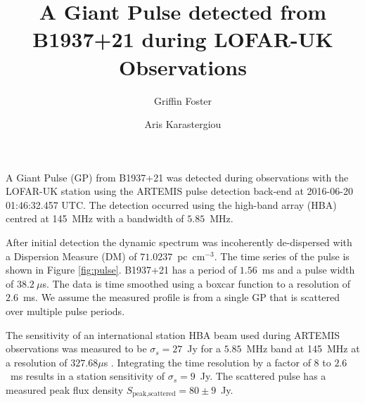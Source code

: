 \documentclass[RNAAS]{aastex62}
\begin{document}
\title{A Giant Pulse detected from B1937+21 during LOFAR-UK Observations}


\author[0000-0002-7559-4291]{Griffin Foster}

\author{Aris Karastergiou}


\section{}


A Giant Pulse (GP) from B1937+21 \citep{1982Natur.300..615B} was detected during
observations with the LOFAR-UK station using the ARTEMIS
\citep{2015MNRAS.452.1254K} pulse detection back-end at 2016-06-20 01:46:32.457
UTC. The detection occurred using the high-band array (HBA) centred at 145~MHz
with a bandwidth of $5.85$~MHz.

After initial detection the dynamic spectrum was incoherently de-dispersed with
a Dispersion Measure (DM) of $71.0237$~pc~cm$^{-3}$.  The time series of the
pulse is shown in Figure \ref{fig:pulse}.  B1937+21 has a period of $1.56$~ms
and a pulse width of $38.2~\mu$s.  The data is time smoothed using a boxcar
function to a resolution of $2.6$~ms. We assume the measured profile is from a
single GP that is scattered over multiple pulse periods.

The sensitivity of an international station HBA beam used during ARTEMIS
observations was measured to be $\sigma_s = 27$~Jy for a $5.85$~MHz band at
145~MHz at a resolution of $327.68 \mu$s \citep{2015MNRAS.452.1254K}.
Integrating the time resolution by a factor of 8 to $2.6$~ms results in a
station sensitivity of $\sigma_s = 9$~Jy. The scattered pulse has a measured
peak flux density $S_{\textrm{peak,scattered}} = 80 \pm 9$~Jy.
\end{document}
